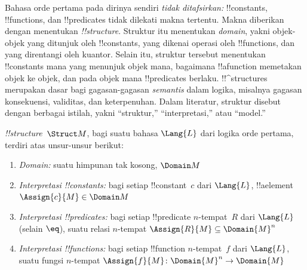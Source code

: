 \documentclass[../../../include/open-logic-section]{subfiles}
\begin{document}


\begin{explain}
Bahasa orde pertama pada dirinya sendiri \emph{tidak ditafsirkan:}
!!{constant}s, !!{function}s, dan !!{predicate}s tidak dilekati makna tertentu.
Makna diberikan dengan menentukan 
\emph{!!{structure}}. Struktur itu menentukan \emph{domain}, yakni
objek-objek yang ditunjuk oleh !!{constant}s, yang dikenai operasi oleh
!!{function}s, dan yang direntangi oleh kuantor. Selain itu, struktur tersebut
menentukan !!{constant}s mana yang menunjuk objek mana, bagaimana
!!a{function} memetakan objek ke objek, dan pada objek mana !!{predicate}s
berlaku. !!^{structure}s merupakan dasar bagi gagasan-gagasan
\emph{semantis} dalam logika, misalnya gagasan konsekuensi, validitas, dan
keterpenuhan. Dalam literatur, struktur disebut dengan berbagai istilah,
yakni ``struktur,'' ``interpretasi,'' atau ``model.''
\end{explain}

\begin{defn}[!!^{structure}s]
 \emph{!!{structure}}~$\Struct M$, bagi suatu bahasa
$\Lang{L}$ dari logika orde pertama, terdiri atas unsur-unsur berikut:
\begin{enumerate}
\item \emph{Domain:} suatu himpunan tak kosong, $\Domain M$
\item \emph{Interpretasi !!{constant}s:} bagi setiap !!{constant}~$c$ dari
  $\Lang{L}$, !!a{element} $\Assign{c}{M} \in \Domain M$
\item \emph{Interpretasi !!{predicate}s:} bagi setiap !!{predicate}
  $n$-tempat~$R$ dari $\Lang{L}$ (selain $\eq$), suatu relasi $n$-tempat
  $\Assign{R}{M} \subseteq \Domain{M}^n$
\item \emph{Interpretasi !!{function}s:} bagi setiap !!{function}
  $n$-tempat~$f$ dari $\Lang{L}$, suatu fungsi $n$-tempat $\Assign{f}{M}
  \colon \Domain{M}^n \to \Domain{M}$
\end{enumerate}
\end{defn}
\end{document}
